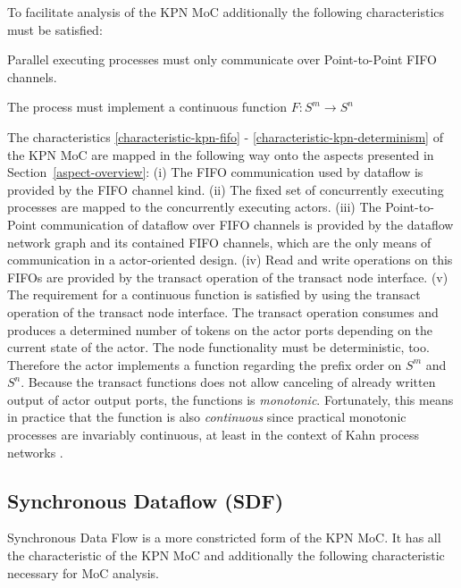 To facilitate analysis of the KPN MoC additionally the following
characteristics must be satisfied:
\begin{characteristic}\label{characteristic-kpn-communication}
  Parallel executing processes must only communicate over Point-to-Point FIFO channels.
\end{characteristic}

\begin{characteristic}\label{characteristic-kpn-determinism}
  The process must implement a continuous function $F: S^m \to S^n$
\end{characteristic}

The characteristics \ref{characteristic-kpn-fifo} -
\ref{characteristic-kpn-determinism} of the KPN MoC are mapped in the following way
onto the aspects presented in Section~\ref{aspect-overview}:
(i) The FIFO communication
used by dataflow is provided by the FIFO channel kind.
(ii) The fixed set of concurrently executing processes
are mapped to the concurrently executing actors.
(iii) The Point-to-Point communication of dataflow over FIFO channels
is provided by the dataflow network graph
and its contained FIFO channels, which are the only means of communication in a
actor-oriented design.
(iv) Read and write operations on this FIFOs are provided by
the transact operation of the transact node interface.
(v) The requirement for a continuous function is satisfied by using the
transact operation of the transact node interface.
The transact operation consumes and produces
a determined number of tokens on the actor ports
depending on the current state of the actor.
The node functionality must be deterministic, too.
Therefore the actor implements a function regarding the
prefix order on $S^m$ and $S^n$. Because the
transact functions does not allow canceling of already
written output of actor output ports, the functions is
\emph{monotonic}. Fortunately, this means in practice
that the function is also \emph{continuous} since practical monotonic
processes are invariably continuous, at least in the context
of Kahn process networks \cite{LeeDenotialDF:1997}.

\subsection{Synchronous Dataflow (SDF)}
Synchronous Data Flow \cite{Lee87b:1987} is a more constricted form of the
KPN MoC. It has all the characteristic of the KPN MoC and additionally the
following characteristic necessary for MoC analysis.


